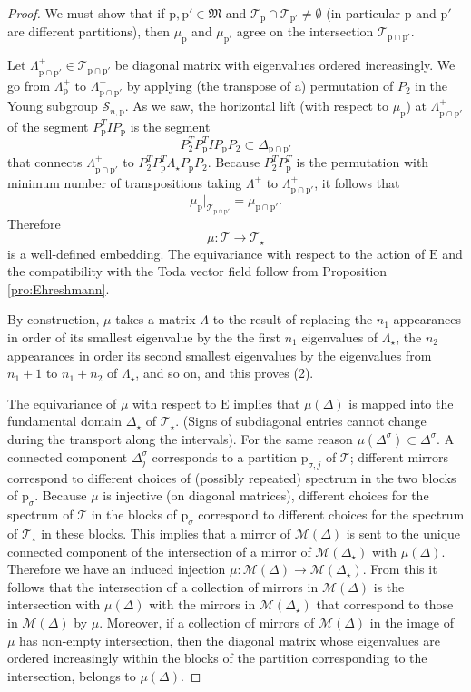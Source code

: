 \documentclass[reqno]{amsart}
\newcommand{\p}{\mathrm{p}}
\newcommand{\cI}{\mathcal{I}}
\newcommand{\cM}{\mathcal{M}}
\newcommand{\cS}{\mathcal{S}}
\newcommand{\cT}{\mathcal{T}}
\newcommand{\E}{\mathrm{E}}
\begin{document}
\begin{proof}
We must show that if $\p,\p'\in \mathfrak{M}$ and $\cT_\p\cap \cT_{\p'}\neq \emptyset$ (in particular $\p$ and $\p'$ are different partitions), then $\mu_\p$ and $\mu_{\p'}$ agree on the intersection $\cT_{\p\cap \p'}$.

Let $\Lambda^+_{\p\cap \p'}\in \cT_{\p\cap \p'}$ be diagonal matrix with eigenvalues ordered increasingly.
We go from $\Lambda^+_\p$ to $\Lambda^+_{\p\cap \p'}$ by applying (the transpose of a) permutation of $P_2$ in the Young subgroup $\cS_{n,\p}$. As we saw, the horizontal lift (with respect to $\mu_\p$) at $\Lambda^+_{\p\cap \p'}$ of the segment $P^T_\p IP_\p$  is the segment
\[P_2^TP_\p^T I P_\p P_2\subset \Delta_{{\p\cap \p'}}\]
that connects $\Lambda^+_{\p\cap \p'}$ to  $P_2^TP_\p^T \Lambda_\star P_\p P_2$. Because $P_2^TP_\p^T$ is the permutation with minimum number of transpositions taking $\Lambda^+$ to $\Lambda_{\p\cap \p'}^+$, it follows that
\[{\mu_\p}|_{\cT_{\p \cap\p'}}=\mu_{\p\cap \p'}.\]
Therefore
\[\mu:\cT\to \cT_\star\]
is a well-defined embedding.
The equivariance with respect to the action of $\E$ and the compatibility with the Toda vector field follow from Proposition \ref{pro:Ehreshmann}.


By construction, $\mu$ takes a matrix $\Lambda$ to the result of replacing the $n_1$ appearances in order of its smallest eigenvalue by the  the first $n_1$ eigenvalues of $\Lambda_\star$, the $n_2$ appearances in order its second smallest eigenvalues by the eigenvalues from $n_1+1$ to $n_1+n_2$ of $\Lambda_\star$, and so on, and this proves (2).

The equivariance of $\mu$ with respect to $\E$ implies that $\mu(\Delta)$ is mapped into the fundamental domain $\Delta_\star$ of $\cT_\star$. (Signs of subdiagonal entries cannot change during the transport along the intervals). For the same reason $\mu(\Delta^\sigma)\subset \Delta^\sigma$. A connected component $\Delta^\sigma_j$ corresponds to a partition $\p_{\sigma,j}$ of $\cT$; different mirrors  correspond to different choices of (possibly repeated) spectrum in the two blocks of $\p_\sigma$. Because $\mu$ is injective (on diagonal matrices), different choices for the spectrum of $\cT$ in the blocks of $\p_\sigma$ correspond to different choices for the spectrum of $\cT_\star$ in these blocks. This implies that a mirror of $\cM(\Delta)$
is sent to the unique connected component of the intersection of a mirror of $\cM(\Delta_\star)$ with $\mu(\Delta)$. Therefore we have an induced injection $\mu:\cM(\Delta)\to \cM(\Delta_\star)$. From this it follows that the intersection of a collection of mirrors  in $\cM(\Delta)$ is the intersection with $\mu(\Delta)$ with the mirrors in $\cM(\Delta_\star)$ that correspond to those in $\cM(\Delta)$ by $\mu$. Moreover, if a collection of mirrors of $\cM(\Delta)$ in the image of $\mu$ has non-empty intersection, then the diagonal matrix whose eigenvalues are ordered increasingly within the blocks of the partition corresponding to the intersection, belongs to $\mu(\Delta)$.
\end{proof}
\end{document}
